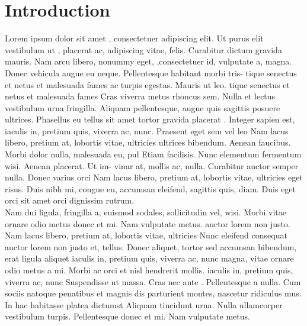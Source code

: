 \documentclass[11pt,a4paper]{article}
\begin{document}
\section{Introduction}

Lorem ipsum dolor sit amet \cite{Phys.Rev.Lett.109.160401} , consectetuer adipiscing elit. Ut purus elit 
vestibulum ut \cite{Ellis:2013yxa}, placerat ac, adipiscing vitae, felis. Curabitur dictum gravida
mauris. Nam arcu libero, nonummy eget, \cite{Phys.Lett.B829(2022)137105, Brod:2013cka,Ellis:2013yxa,Boudjema:2015nda},consectetuer id, vulputate a,
magna. Donec vehicula augue eu neque. Pellentesque habitant morbi tris-
tique senectus et netus et malesuada fames ac turpis egestas. Mauris ut leo. tique senectus et netus et malesuada fames 
Cras viverra metus rhoncus sem. Nulla et lectus vestibulum urna fringilla.  Aliquam pellentesque, augue quis sagittis posuere
ultrices. Phasellus eu tellus sit amet tortor gravida placerat \cite{Khachatryan:2016vau,Bhattacharyya:2012tj}. Integer sapien
est, iaculis in, pretium quis, viverra ac, nunc. Praesent eget sem vel leo Nam lacus libero, pretium at, lobortis vitae, ultricies
ultrices bibendum. Aenean faucibus. Morbi dolor nulla, malesuada eu, pul Etiam facilisis. Nunc elementum fermentum wisi. Aenean placerat. Ut im-
vinar at, mollis ac, nulla. Curabitur auctor semper nulla. Donec varius orci Nam lacus libero, pretium at, lobortis vitae, ultricies
eget risus. \cite{hep-ph/9605326,BhupalDev:2007ftb} Duis nibh mi, congue eu, accumsan eleifend, sagittis quis, diam.
Duis eget orci sit amet orci dignissim rutrum.\\

Nam dui ligula, fringilla a, euismod sodales, sollicitudin vel, wisi. Morbi vitae ornare odio metus donec et mi. Nam vulputate metus.
auctor lorem non justo. Nam lacus libero, pretium at, lobortis vitae, ultricies Nunc eleifend consequat auctor lorem non justo
et, tellus. Donec aliquet, tortor sed accumsan bibendum, erat ligula aliquet iaculis in, pretium quis, viverra ac, nunc
magna, vitae ornare odio metus a mi. Morbi ac orci et nisl hendrerit mollis.  iaculis in, pretium quis, viverra ac, nunc
Suspendisse ut massa. Cras nec ante \cite{SciPostPhys.7(2019)014,Comput.Phys.Commun.276(2022)108330}. Pellentesque a nulla. Cum sociis
natoque penatibus et magnis dis parturient montes, nascetur ridiculus mus.  In hac habitasse platea dictumst
Aliquam tincidunt urna. Nulla ullamcorper vestibulum turpis. Pellentesque donec et mi. Nam vulputate metus.
\end{document}
